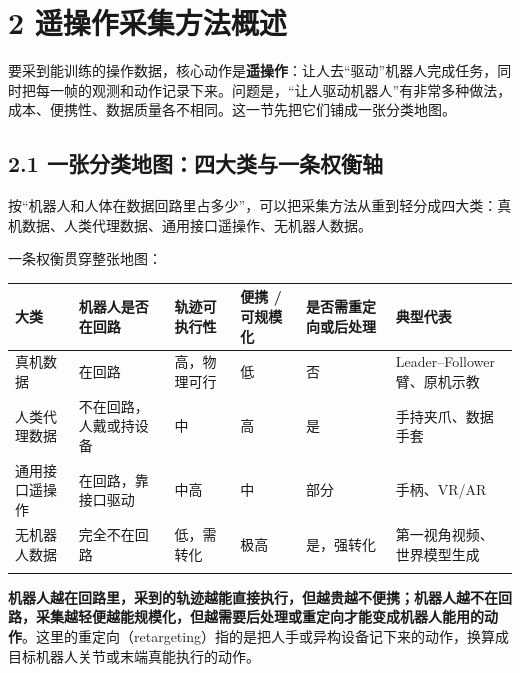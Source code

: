 \documentclass[
  chinese,
]{ctexart}
\begin{document}
\section{2
遥操作采集方法概述}\label{ux9065ux64cdux4f5cux91c7ux96c6ux65b9ux6cd5ux6982ux8ff0}

要采到能训练的操作数据，核心动作是\textbf{遥操作}：让人去``驱动''机器人完成任务，同时把每一帧的观测和动作记录下来。问题是，``让人驱动机器人''有非常多种做法，成本、便携性、数据质量各不相同。这一节先把它们铺成一张分类地图。

\subsection{2.1
一张分类地图：四大类与一条权衡轴}\label{ux4e00ux5f20ux5206ux7c7bux5730ux56feux56dbux5927ux7c7bux4e0eux4e00ux6761ux6743ux8861ux8f74}

按``机器人和人体在数据回路里占多少''，可以把采集方法从重到轻分成四大类：真机数据、人类代理数据、通用接口遥操作、无机器人数据。

一条权衡贯穿整张地图：

\begin{center}
\begin{tabular}{@{}>{\raggedright\arraybackslash}p{} >{\raggedright\arraybackslash}p{} >{\raggedright\arraybackslash}p{} >{\raggedright\arraybackslash}p{} >{\raggedright\arraybackslash}p{} >{\raggedright\arraybackslash}p{}@{}}
\toprule\noalign{}
大类 & 机器人是否在回路 & 轨迹可执行性 & 便携 / 可规模化 & 是否需重定向或后处理 & 典型代表 \\
\midrule\noalign{}
真机数据 & 在回路 & 高，物理可行 & 低 & 否 & Leader--Follower 臂、原机示教 \\
人类代理数据 & 不在回路，人戴或持设备 & 中 & 高 & 是 & 手持夹爪、数据手套 \\
通用接口遥操作 & 在回路，靠接口驱动 & 中高 & 中 & 部分 & 手柄、VR/AR \\
无机器人数据 & 完全不在回路 & 低，需转化 & 极高 & 是，强转化 & 第一视角视频、世界模型生成 \\
\bottomrule\noalign{}
\end{tabular}
\end{center}

\textbf{机器人越在回路里，采到的轨迹越能直接执行，但越贵越不便携；机器人越不在回路，采集越轻便越能规模化，但越需要后处理或重定向才能变成机器人能用的动作}。这里的重定向（retargeting）指的是把人手或异构设备记下来的动作，换算成目标机器人关节或末端真能执行的动作。
\end{document}
